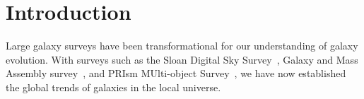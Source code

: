 \section{Introduction} \label{sec:intro} 
Large galaxy surveys have been transformational for our understanding of galaxy
evolution. 
With surveys such as the Sloan Digital Sky Survey~\citep[SDSS][]{york2000},
Galaxy and Mass Assembly survey~\citep[GAMA][]{driver2011}, and 
PRIsm MUlti-object Survey~\citep[PRIMUS][]{coil2011}, 
we have now established the global trends of galaxies in the local universe. 




